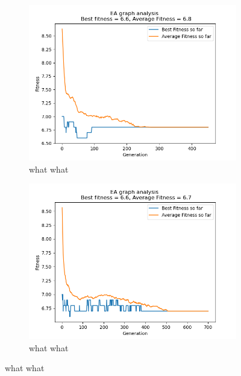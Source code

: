 \documentclass[conference,compsoc]{IEEEtran}
\begin{document}
\begin{figure}[h!]
  \centering 
  \begin{subfigure}{0.34\textwidth}
    \includegraphics[width=\linewidth]{../Results/_11_FPS_Truncation_100_50_450.png}
    \caption{what what}
  \end{subfigure}
  \begin{subfigure}{0.34\textwidth}
    \includegraphics[width=\linewidth]{../Results/_11_RBS_Truncation_100_50_700.png}
    \caption{what what}
  \end{subfigure}
  \label{fig:graphs2}
\end{figure}
\end{document}
